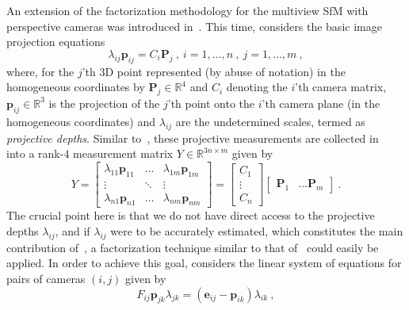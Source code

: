 \documentclass[10pt]{article}
\newcommand{\R}{\ensuremath{\mathbb{R}}}
\begin{document}
An extension of the factorization methodology for the multiview SfM with perspective cameras was introduced in~\cite{SturmFactorization}. This time, \cite{SturmFactorization} considers the basic image projection equations
\begin{equation}
\label{eq:FactorProjBasic}
\lambda_{ij}\mathbf{p}_{ij} = C_i\mathbf{P}_j \ , \ i = 1,\ldots,n \ , \ j = 1,\ldots,m \ ,
\end{equation}
where, for the $j$'th $3$D point represented (by abuse of notation) in the homogeneous coordinates by $\mathbf{P}_j\in\R^4$ and $C_i$ denoting the $i$'th camera matrix, $\mathbf{p}_{ij}\in\R^3$ is the projection of the $j$'th point onto the $i$'th camera plane (in the homogeneous coordinates) and $\lambda_{ij}$ are the undetermined scales, termed as \textit{projective depths}. Similar to~\cite{TomasiKanadeFactor}, these projective measurements are collected in~\cite{SturmFactorization} into a rank-$4$ measurement matrix $Y\in\R^{3n\times m}$ given by
\begin{equation}
\label{eq:FactorMeasMatrixProj}
Y =  \left[\begin{matrix} \lambda_{11}\mathbf{p}_{11} & \hdots & \lambda_{1m}\mathbf{p}_{1m}\\ \vdots & \ddots & \vdots \\ \lambda_{n1}\mathbf{p}_{n1} & \hdots & \lambda_{nm}\mathbf{p}_{nm} \end{matrix}\right] = \left[\begin{matrix}C_1\\ \vdots \\ C_n\end{matrix}\right]\left[\begin{matrix}\mathbf{P}_1 & \hdots  \mathbf{P}_m\end{matrix}\right] \ .
\end{equation}
The crucial point here is that we do not have direct access to the projective depths $\lambda_{ij}$, and if $\lambda_{ij}$ were to be accurately estimated, which constitutes the main contribution of~\cite{SturmFactorization}, a factorization technique similar to that of~\cite{TomasiKanadeFactor} could easily be applied. In order to achieve this goal, \cite{SturmFactorization} considers the linear system of equations for pairs of cameras $(i,j)$ given by  
\begin{equation}
\label{eq:FactorFndMtx}
F_{ij}\mathbf{p}_{jk}\lambda_{jk} = (\mathbf{e}_{ij}-\mathbf{p}_{ik})\lambda_{ik} \ ,
\end{equation}
\end{document}
